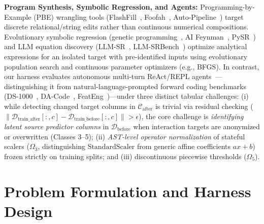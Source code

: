 \documentclass[sigconf]{acmart}
\begin{document}
\noindent\textbf{Program Synthesis, Symbolic Regression, and Agents:} Programming-by-Example (PBE) wrangling tools (FlashFill~\cite{gulwani2011flashfill}, Foofah~\cite{jin2017foofah}, Auto-Pipeline~\cite{yang2021autopipeline}) target discrete relational/string edits rather than continuous numerical compositions. Evolutionary symbolic regression (genetic programming~\cite{schmidt2009distilling}, AI Feynman~\cite{udrescu2020ai}, PySR~\cite{cranmer2023pysr}) and LLM equation discovery (LLM-SR~\cite{shojaee2025llmsr}, LLM-SRBench~\cite{shojaee2025llmsrbench}) optimize analytical expressions for an isolated target with pre-identified inputs using evolutionary population search and continuous parameter optimizers (e.g., BFGS). In contrast, our harness evaluates autonomous multi-turn ReAct/REPL agents~\cite{yao2023react,langgraph2024}—distinguishing it from natural-language-prompted forward coding benchmarks (DS-1000~\cite{lai2023ds1000}, DA-Code~\cite{huang2024dacode}, FeatEng~\cite{pietruszka2025feateng})—under three distinct tabular challenges: (i) while detecting changed target columns in $\mathcal{C}_{\text{after}}$ is trivial via residual checking ($\|\mathcal{D}_{\text{train\_after}}[:, c] - \mathcal{D}_{\text{train\_before}}[:, c]\| > \epsilon$), the core challenge is \emph{identifying latent source predictor columns} in $\mathcal{D}_{\text{before}}$ when interaction targets are anonymized or overwritten (Classes 3--5); (ii) \emph{AST-level operator normalization} of stateful scalers ($\Omega_3$, distinguishing $\text{StandardScaler}$ from generic affine coefficients $ax+b$) frozen strictly on training splits; and (iii) discontinuous piecewise thresholds ($\Omega_5$).

\section{Problem Formulation and Harness Design}
\end{document}
